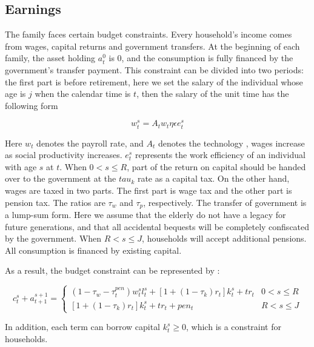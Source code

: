 \documentclass{article}
\begin{document}
    \subsection{Earnings}
        The family faces certain budget constraints. Every household's income comes from wages, 
        capital returns and government transfers. At the beginning of each family, the asset holding $a_t^0$ is $0$, 
        and the consumption is fully financed by the government's transfer payment. This constraint can be divided into two 
        periods: the first part is before retirement, here we set the salary of the individual whose age is $j$ when the calendar 
        time is $t$, then the salary of the unit time has the following form

        \begin{equation}
            w_t^s=A_tw_t\eta\epsilon e_t^s
        \end{equation}

        Here $w_t$ denotes the payroll rate, and $A_t$ denotes the technology , wages increase as social productivity increases. 
        $e_t^s$ represents the work efficiency of an individual with age $s$ at $t$. 
        When $0<s\leq R$, part of the return on capital should be handed over to the government at the $tau_k$ rate as a capital tax. 
        On the other hand, wages are taxed in two parts. The first part is wage tax and the other part is pension tax. 
        The ratios are $\tau_w$ and $\tau_p$, respectively. The transfer of government is a lump-sum form. 
        Here we assume that the elderly do not have a legacy for future generations, and that all accidental bequests 
        will be completely confiscated by the government. When $R<s\leq J$, households will accept additional pensions. 
        All consumption is financed by existing capital.

        As a result, the budget constraint can be represented by :
        
        \begin{equation}
            c_t^s+a_{t+1}^{s+1}=
            \begin{cases}
            (1-\tau_w-\tau_t^{pen})w_t^s l_t^s+[1+(1-\tau_k)r_t]k_t^s+tr_t& 0<s\leq R\\
            [1+(1-\tau_k)r_t]k_t^s+tr_t+pen_t& R<s\leq J
            \end{cases}
        \end{equation}

        In addition, each term can borrow capital $k_t^s\ge 0$, which is a constraint for households.
\end{document}
